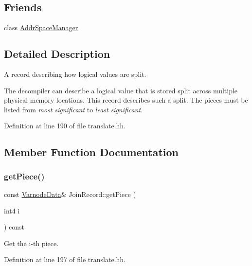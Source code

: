 \subsection*{Friends}
\begin{DoxyCompactItemize}
\item 
class \mbox{\hyperlink{class_join_record_a0e578f3e90e10ec045899c0e9cb65d46}{Addr\+Space\+Manager}}
\end{DoxyCompactItemize}


\subsection{Detailed Description}
A record describing how logical values are split. 

The decompiler can describe a logical value that is stored split across multiple physical memory locations. This record describes such a split. The pieces must be listed from {\itshape most} {\itshape significant} to {\itshape least} {\itshape significant}. 

Definition at line 190 of file translate.\+hh.



\subsection{Member Function Documentation}
\mbox{\label{class_join_record_a5d3feebaadef123349cda1564717b9d7}} 
\subsubsection{\texorpdfstring{getPiece()}{getPiece()}}
{\footnotesize\ttfamily const \mbox{\hyperlink{struct_varnode_data}{Varnode\+Data}}\& Join\+Record\+::get\+Piece (\begin{DoxyParamCaption}\item[{int4}]{i }\end{DoxyParamCaption}) const\hspace{0.3cm}{\ttfamily [inline]}}



Get the i-\/th piece. 



Definition at line 197 of file translate.\+hh.

